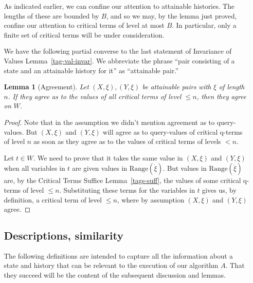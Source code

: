 \documentclass{LMCS}
\newtheorem{la}[thm]{Lemma}
\theoremstyle{definition}
\newcommand{\ans}{\dot}
\newcommand{\ran}[1]{\ensuremath{{\text{Range}}(#1)}}
\begin{document}
As indicated earlier, we can confine our attention to attainable
histories.  The lengths of these are bounded by $B$, and so we
may, by the lemma just proved, confine our attention to critical
terms of level at most $B$.  In particular, only a finite set of
critical terms will be under consideration.

We have the following partial converse to the last statement of
Invariance of Values Lemma~\ref{tag-val-invar}.  We abbreviate the
phrase ``pair consisting of a state and an attainable history for it''
as ``attainable pair.''

\begin{la}[Agreement]\label{lemma:agree}
Let $(X,\xi), (Y,\xi)$ be attainable pairs with $\xi$ of length $n$.
If they agree as to the values of all critical terms of level
$\le n$, then they agree on $W$.
\end{la}

\begin{proof}
Note that in the assumption we didn't mention agreement as to
query-values. But $(X,\xi)$ and $(Y,\xi)$ will agree as to
query-values of critical q-terms of level $n$ as soon as they agree as
to the values of critical terms of levels $<n$.

Let $t \in W$. We need to prove that it takes the same value in
$(X,\xi)$ and $(Y,\xi)$ when all variables in $t$ are given values
in $\ran{\ans\xi}$. But values in $\ran{\ans\xi}$ are, by the
Critical Terms Suffice Lemma~\ref{tags-suff}, the values of some
critical q-terms of level $\le n$. Substituting these terms for the
variables in $t$ gives us, by definition, a critical term of level
$\le n$, where by assumption $(X,\xi)$ and $(Y,\xi)$ agree.
\end{proof}

\subsection{Descriptions, similarity}

The following definitions are intended to capture all the information
about a state and history that can be relevant to the execution of our
algorithm $A$.  That they succeed will be the content of the subsequent
discussion and lemmas.
\end{document}
